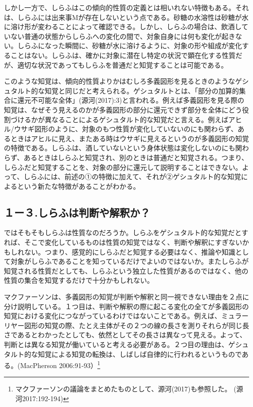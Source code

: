 \documentclass[b5j,twoside,twocolumn]{utarticle}
\begin{document}
{しかし一方で、しらふはこの傾向的性質の定義とは相いれない特徴もある。それは、しらふには出来事Mが存在しないという点である。砂糖の水溶性は砂糖が水に溶け形が変わることによって確認できる。しかし、しらふの場合は、飲酒していない普通の状態からしらふへの変化の間で、対象自身には何も変化が起きない。しらふになった瞬間に、砂糖が水に溶けるように、対象の形や組成が変化することはない。しらふは、確かに対象に潜在し特定の状況で顕在化する性質だが、適切な状況であってもしらふを普通だと知覚することは可能である。

このような知覚は、傾向的性質よりかはむしろ多義図形を見るときのようなゲシュタルト的な知覚と同じだと考えられる。ゲシュタルトとは、「部分の加算的集合に還元不可能な全体」(源河(2017):3)と言われる。例えば多義図形を見る際の知覚は、なぜそう見えるのかが多義図形の部分に還元できず部分を全体にどう役割づけるかが異なることによるゲシュタルト的な知覚だと言える。例えばアヒル/ウサギ図形のように、対象のもつ性質が変化していないのにも関わらず、あるときはアヒルに見え、またある時はウサギに見えるというのが多義図形の知覚の特徴である。しらふは、酒していないという身体状態は変化しないのにも関わらず、あるときはしらふと知覚され、別のときは普通だと知覚される。つまり、しらふだと知覚することを、対象の部分に還元して説明することはできない。よって、しらふには、前述の①の特徴に加えて、それが②ゲシュタルト的な知覚によるという新たな特徴があることがわかる。

\subsection{１ー３.しらふは判断や解釈か？}

ではそもそもしらふは性質なのだろうか。しらふをゲシュタルト的な知覚だとすれば、そこで変化しているものは性質の知覚ではなく、判断や解釈にすぎないかもしれない。つまり、感覚的にしらふだと知覚する必要はなく、推論や知識として対象がしらふであることを知っているだけでよいのではないか。またしらふが知覚される性質だとしても、しらふという独立した性質があるのではなく、他の性質の集合を知覚するだけで十分かもしれない。

マクファーソンは、多義図形の知覚が判断や解釈と同一視できない理由を２点に分け説明している。１つ目は、判断や解釈の際に起こる変化の全てが多義図形の知覚における変化につながっているわけではないことである。例えば、ミュラーリヤー図形の知覚の際、たとえ主体がその２つの線の長さを測りそれらが同じ長さであるとわかったとしても、依然としてその長さは異なって見える。よって、判断とは異なる知覚が働いていると考える必要がある。２つ目の理由は、ゲシュタルト的な知覚による知覚の転換は、しばしば自律的に行われるというものである。(MacPherson 2006:91-93）\footnote{マクファーソンの議論をまとめたものとして、源河(2017)も参照した。 (源河2017:192-194)}

}
\end{document}
